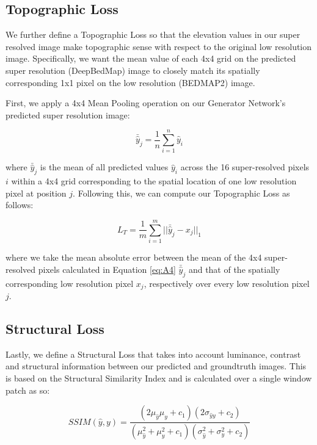 \documentclass[tc, manuscript]{copernicus}
\begin{document}
\subsection{Topographic Loss}

We further define a Topographic Loss so that the elevation values in our super resolved image make topographic sense with respect to the original low resolution image.
Specifically, we want the mean value of each 4x4 grid on the predicted super resolution (DeepBedMap) image to closely match its spatially corresponding 1x1 pixel on the low resolution (BEDMAP2) image.

First, we apply a 4x4 Mean Pooling operation on our Generator Network's predicted super resolution image:

\begin{equation}\label{eq:A4}
 \bar{\hat{y}}_j = \dfrac{1}{n} \sum\limits_{i=1}^n \hat{y}_i
\end{equation}

where $\bar{\hat{y}}_j$ is the mean of all predicted values $\hat{y}_i$ across the 16 super-resolved pixels $i$ within a 4x4 grid corresponding to the spatial location of one low resolution pixel at position $j$.
Following this, we can compute our Topographic Loss as follows:

\begin{equation}\label{eq:A5}
  L_T = \dfrac{1}{m} \sum\limits_{i=1}^m ||\bar{\hat{y}}_j - x_j||_{1}
\end{equation}

where we take the mean absolute error between the mean of the 4x4 super-resolved pixels calculated in Equation \eqref{eq:A4} $\bar{\hat{y}}_j$ and that of the spatially corresponding low resolution pixel $x_j$, respectively over every low resolution pixel $j$.

\subsection{Structural Loss}

Lastly, we define a Structural Loss that takes into account luminance, contrast and structural information between our predicted and groundtruth images.
This is based on the Structural Similarity Index \citep[SSIM,][]{WangImageQualityAssessment2004} and is calculated over a single window patch as so:

\begin{equation}\label{eq:A6}
  SSIM(\hat{y}, y) = \dfrac{(2\mu_{\hat{y}}\mu_y + c_1)(2\sigma_{{\hat{y}}y} + c_2)}{(\mu_{\hat{y}}^2 + \mu_y^2 + c_1)(\sigma_{\hat{y}}^2 + \sigma_y^2 + c_2)}
\end{equation}
\end{document}
